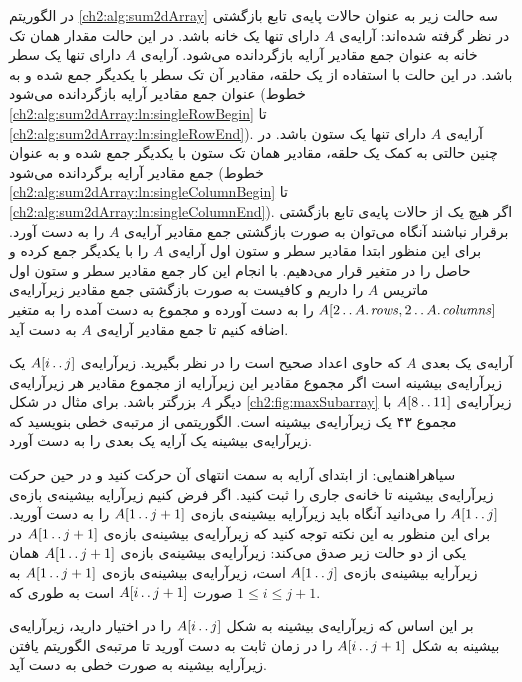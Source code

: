 در الگوریتم {\eqref{ch2:alg:sum2dArray}} سه حالت زیر به عنوان حالات پایه‌ی تابع بازگشتی در نظر گرفته شده‌اند:
 آرایه‌ی {$A$} دارای تنها یک خانه باشد. در این حالت مقدار همان تک خانه به عنوان جمع مقادیر آرایه بازگردانده می‌شود.
 آرایه‌ی {$A$} دارای تنها یک سطر باشد. در این حالت با استفاده از یک حلقه، مقادیر آن تک سطر با یکدیگر جمع شده و به عنوان جمع مقادیر آرایه بازگردانده می‌شود (خطوط {\ref{ch2:alg:sum2dArray:ln:singleRowBegin}} تا {\ref{ch2:alg:sum2dArray:ln:singleRowEnd}}).
 آرایه‌ی {$A$} دارای تنها یک ستون باشد. در چنین حالتی به کمک یک حلقه، مقادیر همان تک ستون با یکدیگر جمع شده و به عنوان جمع مقادیر آرایه برگردانده می‌شود (خطوط {\ref{ch2:alg:sum2dArray:ln:singleColumnBegin}} تا {\ref{ch2:alg:sum2dArray:ln:singleColumnEnd}}).
اگر هیچ یک از حالات پایه‌ی تابع بازگشتی برقرار نباشند آنگاه می‌توان به صورت بازگشتی جمع مقادیر آرایه‌ی {$A$} را به دست آورد. برای این منظور ابتدا مقادیر سطر و ستون اول آرایه‌ی {$A$} را با یکدیگر جمع کرده و حاصل را در متغیر {} قرار می‌دهیم. با انجام این کار جمع مقادیر سطر و ستون اول ماتریس {$A$} را داریم و کافیست به صورت بازگشتی جمع مقادیر زیرآرایه‌ی {$A[2\mathinner{\ldotp\ldotp} A.\hspace*{1pt}\mathit{rows},2\mathinner{\ldotp\ldotp} A.\hspace*{1pt}\mathit{columns}]$} را به دست آورده و مجموع به دست آمده را به متغیر {} اضافه کنیم تا جمع مقادیر آرایه‌ی {$A$} به دست آید.

 آرایه‌ی‌ یک بعدی {$A$} که حاوی اعداد صحیح است را در نظر بگیرید. زیرآرایه‌ی {$A[i\mathinner{\ldotp\ldotp} j]$} یک زیرآرایه‌ی بیشینه است اگر مجموع مقادیر این زیرآرایه از مجموع مقادیر هر زیرآرایه‌ی دیگر {$A$} بزرگتر باشد. برای مثال در شکل {\eqref{ch2:fig:maxSubarray}} زیرآرایه‌ی {$A[8\mathinner{\ldotp\ldotp} 11]$} با مجموع ۴۳ یک زیرآرایه‌ی بیشینه است. الگوریتمی از مرتبه‌ی خطی بنویسید که زیرآرایه‌ی بیشینه یک آرایه یک بعدی را به دست آورد.

‌سیاه{راهنمایی:} از ابتدای آرایه به سمت انتهای آن حرکت کنید و در حین حرکت زیرآرایه‌ی بیشینه تا خانه‌ی جاری را ثبت کنید. اگر فرض کنیم زیرآرایه بیشینه‌ی بازه‌ی {$A[1\mathinner{\ldotp\ldotp} j]$} را می‌دانید آنگاه باید زیرآرایه بیشینه‌ی بازه‌ی {$A[1\mathinner{\ldotp\ldotp} j+1]$} را به دست آورید. برای این منظور به این نکته توجه کنید که زیرآرایه‌ی بیشینه‌ی بازه‌ی {$A[1\mathinner{\ldotp\ldotp} j+1]$} در یکی از دو حالت زیر صدق می‌کند:
 زیرآرایه‌ی بیشینه‌ی بازه‌ی {$A[1\mathinner{\ldotp\ldotp} j+1]$} همان زیرآرایه بیشینه‌ی بازه‌ی {$A[1\mathinner{\ldotp\ldotp} j]$} است،
 زیرآرایه‌ی بیشینه‌ی بازه‌ی {$A[1\mathinner{\ldotp\ldotp} j+1]$} به صورت {$A[i\mathinner{\ldotp\ldotp} j+1]$} است به طوری که {$1\leq i\leq j+1$}.

بر این اساس که زیرآرایه‌ی بیشینه به شکل {$A[i\mathinner{\ldotp\ldotp} j]$} را در اختیار دارید، زیرآرایه‌ی بیشینه به شکل {$A[i\mathinner{\ldotp\ldotp} j+1]$} را در زمان ثابت به دست آورید تا مرتبه‌ی الگوریتم یافتن زیرآرایه بیشینه به صورت خطی به دست آید.

